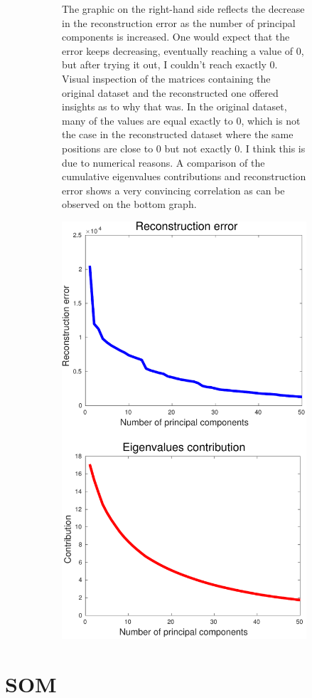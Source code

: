 \documentclass[11pt, a4paper]{article}
\begin{document}
\begin{figure}[H]
    \centering
    \begin{subfigure}[b]{.5\textwidth}
      The graphic on the right-hand side reflects the decrease in the
      reconstruction error as the number of principal components is
      increased. One would expect that the error keeps decreasing,
      eventually reaching a value of 0, but after trying it out, I
      couldn't reach exactly 0. Visual inspection of the matrices
      containing the original dataset and the reconstructed one
      offered insights as to why that was. In the original dataset,
      many of the values are equal exactly to 0, which is not the case
      in the reconstructed dataset where the same positions are close
      to 0 but not exactly 0. I think this is due to numerical
      reasons. A comparison of the cumulative eigenvalues
      contributions and reconstruction error shows a very convincing
      correlation as can be observed on the bottom graph.
    \end{subfigure}%
    \begin{subfigure}{.4\textwidth}
      \vspace{-160pt}
      \centering
      \includegraphics[width=0.8\linewidth]{unsupervised_reconstruction_error.pdf}
    \end{subfigure}
\end{figure}

\section{SOM}

%  
% 
\end{document}
